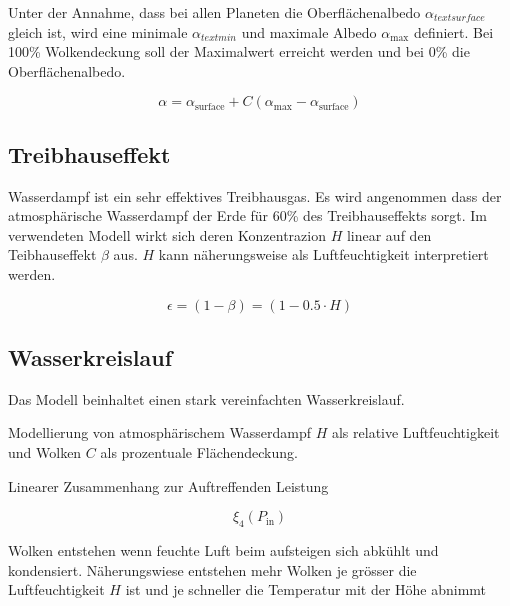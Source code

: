\begin{refsection}
Unter der Annahme, dass bei allen Planeten die Oberflächenalbedo $\alpha_{text{surface}}$ gleich ist, wird eine minimale $\alpha_{text{min}}$ und maximale Albedo $\alpha_{\text{max}}$ definiert. Bei 100\% Wolkendeckung soll der Maximalwert erreicht werden und bei 0\% die Oberflächenalbedo.

\begin{equation}
\alpha = \alpha_{\text{surface}} + C(\alpha_{\text{max}} - \alpha_{\text{surface}})
\end{equation}

\subsection{Treibhauseffekt}

Wasserdampf ist ein sehr effektives Treibhausgas. Es wird angenommen dass der atmosphärische Wasserdampf der Erde für 60\% des Treibhauseffekts sorgt.  
Im verwendeten Modell wirkt sich deren Konzentrazion $H$ linear auf den Teibhauseffekt $\beta$ aus. $H$ kann näherungsweise als Luftfeuchtigkeit interpretiert werden.

\begin{equation}
\epsilon  = (1 - \beta) = (1 - 0.5 \cdot H)
\end{equation}

\subsection{Wasserkreislauf}

Das Modell beinhaltet einen stark vereinfachten Wasserkreislauf.

Modellierung von atmosphärischem Wasserdampf $H$ als relative Luftfeuchtigkeit und Wolken $C$ als prozentuale Flächendeckung.




Linearer Zusammenhang zur Auftreffenden Leistung

\begin{equation}
\xi_4 (P_{\text{in}})
\end{equation}


Wolken entstehen wenn feuchte Luft beim aufsteigen sich abkühlt und kondensiert. Näherungswiese entstehen mehr Wolken je grösser die Luftfeuchtigkeit $H$ ist und je schneller die Temperatur mit der Höhe abnimmt


\end{refsection}
